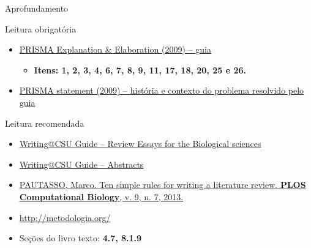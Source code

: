 \documentclass{beamer}
\begin{document}
\begin{frame}{Aprofundamento}
  \begin{block}{Leitura obrigatória}
    \begin{itemize}
      \footnotesize
    \item \href{https://doi.org/10.1371/journal.pmed.1000100}
      {PRISMA Explanation \& Elaboration (2009) -- {\tiny guia}}
      \begin{itemize}
        \tiny
      \item {\bf Itens: 1, 2, 3, 4, 6, 7, 8, 9, 11, 17, 18, 20, 25 e 26.}
      \end{itemize}
      \smallskip
    \item {\footnotesize \href{https://doi.org/10.1371/journal.pmed.1000097}
        {PRISMA statement (2009) -- {\tiny história e contexto do problema resolvido pelo guia}}}
    \end{itemize}
  \end{block}
  \begin{block}{Leitura recomendada}
    \begin{itemize}
      \tiny
    \item
      \href{https://writing.colostate.edu/guides/guide.cfm?guideid=79}{Writing@CSU Guide -- Review Essays for the Biological sciences}
    \item \href{https://writing.colostate.edu/guides/guide.cfm?guideid=59}{Writing@CSU Guide -- Abstracts}
    \item \href{https://doi.org/10.1371/journal.pcbi.1003149}
      {PAUTASSO, Marco. Ten simple rules for writing a literature review. {\bf PLOS Computational Biology}, v. 9, n. 7, 2013.}
    \end{itemize}
    \begin{itemize}
      \tiny
    \item \url{http://metodologia.org/}
    \item Seções do livro texto: {\bf 4.7, 8.1.9}
    \end{itemize}
  \end{block}
\end{frame}
\end{document}
